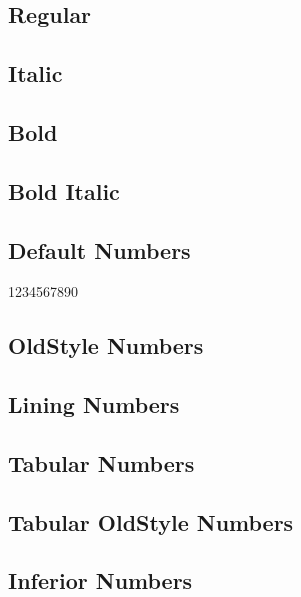 \documentclass[12pt]{article}
\begin{document}
\sloppy

\subsection*{Regular}
\lipsum[1]

\subsection*{Italic}
\textit{\lipsum[2]} 

\subsection*{Bold}
\textbf{\lipsum[3]}

\subsection*{Bold Italic}

\textbf{\textit{\lipsum[4]}}

\subsection*{Default Numbers}

1234567890

\subsection*{OldStyle Numbers}

{}

\subsection*{Lining Numbers}

{}


\subsection*{Tabular Numbers}

{}

\subsection*{Tabular OldStyle Numbers}

{}

\subsection*{Inferior Numbers}
\end{document}

